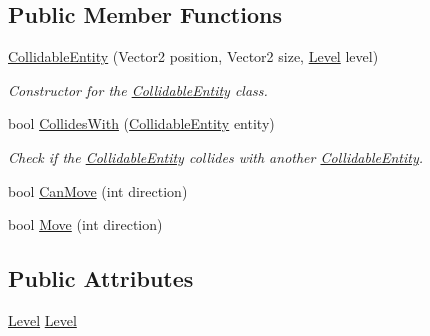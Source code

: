 \subsection*{Public Member Functions}
\begin{DoxyCompactItemize}
\item 
\hyperlink{class_athena_engine_1_1_framework_1_1_primatives_1_1_collidable_entity_ad12477e4fd7354414489c9560a008f11}{Collidable\-Entity} (Vector2 position, Vector2 size, \hyperlink{class_athena_engine_1_1_framework_1_1_gameplay_1_1_level}{Level} level)
\begin{DoxyCompactList}\small\item\em Constructor for the \hyperlink{class_athena_engine_1_1_framework_1_1_primatives_1_1_collidable_entity}{Collidable\-Entity} class. \end{DoxyCompactList}\item 
bool \hyperlink{class_athena_engine_1_1_framework_1_1_primatives_1_1_collidable_entity_a32ca7c9bf12863dd4055d0e0b639440f}{Collides\-With} (\hyperlink{class_athena_engine_1_1_framework_1_1_primatives_1_1_collidable_entity}{Collidable\-Entity} entity)
\begin{DoxyCompactList}\small\item\em Check if the \hyperlink{class_athena_engine_1_1_framework_1_1_primatives_1_1_collidable_entity}{Collidable\-Entity} collides with another \hyperlink{class_athena_engine_1_1_framework_1_1_primatives_1_1_collidable_entity}{Collidable\-Entity}. \end{DoxyCompactList}\item 
bool \hyperlink{class_athena_engine_1_1_framework_1_1_primatives_1_1_collidable_entity_a85bb43d3bcd4296805585848a08bc3cf}{Can\-Move} (int direction)
\item 
bool \hyperlink{class_athena_engine_1_1_framework_1_1_primatives_1_1_collidable_entity_a1032a7744ff1323f091806b3ccfcbd90}{Move} (int direction)
\end{DoxyCompactItemize}
\subsection*{Public Attributes}
\begin{DoxyCompactItemize}
\item 
\hyperlink{class_athena_engine_1_1_framework_1_1_gameplay_1_1_level}{Level} \hyperlink{class_athena_engine_1_1_framework_1_1_primatives_1_1_collidable_entity_a3ea8e55331d01362ada8ca0a85c88a69}{Level}
\end{DoxyCompactItemize}
